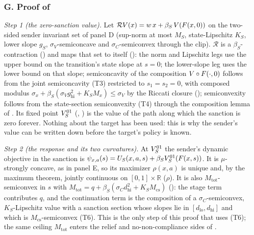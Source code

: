 \subsubsection*{G. Proof of }

\emph{Step 1 (the zero-sanction value).} Let
$\mathcal R V(x)=w\,x+\beta_S\,V(F(x,0))$ on the two-sided sender invariant set of
panel D (sup-norm at most $M_S$, state-Lipschitz $K_S$, lower slope $g_S$,
$\sigma_V$-semiconcave and $\sigma_C$-semiconvex through the clip). $\mathcal
R$ is a $\beta_S$-contraction () and maps that
set to itself (): the norm and Lipschitz legs use the
upper bound on the transition's state slope at $s=0$; the lower-slope leg uses
the lower bound on that slope;
semiconcavity of the composition $V\circ F(\cdot,0)$ follows from the joint
semiconcavity (T3) restricted to $s_1=s_2=0$, with composed modulus
$\sigma_x+\beta_S(\sigma_Vg_{\mathrm{hi}}^2+K_SM_x)\le\sigma_V$ by the Riccati closure
(); semiconvexity follows from the state-section
semiconvexity (T4) through the composition lemma of
. Its fixed point $V_S^{01}$
(, ) is the value of the path along which the
sanction is zero forever. Nothing about the target has been used: this is why
the sender's value can be written down before the target's policy is known.

\emph{Step 2 (the response and its two curvatures).} At $V_S^{01}$ the sender's
dynamic objective in the sanction is
$\psi_{x,a}(s)=U_S(x,a,s)+\beta_SV_S^{01}(F(x,s))$. It is $\mu$-strongly
concave, as in panel E, so its maximizer $\rho(x,a)$ is unique and, by the
maximum theorem, jointly continuous on $[0,1]\times\mathbb R$
($\rho$). It is also $M_{\mathrm{tot}}$-semiconvex in $s$
with
$M_{\mathrm{tot}}=q+\beta_S(\sigma_Cd_{\mathrm{hi}}^2+K_SM_{\mathrm{cs}})$
(): the stage term contributes $q$, and the
continuation term is the composition of a $\sigma_C$-semiconvex, $K_S$-Lipschitz
value with a sanction section whose slopes lie in $[d_{\mathrm{lo}},d_{\mathrm{hi}}]$
and which is $M_{\mathrm{cs}}$-semiconvex (T6). This is the only step of this proof
that uses (T6); the same ceiling $M_{\mathrm{tot}}$ enters the relief and
no-non-compliance sides of .

